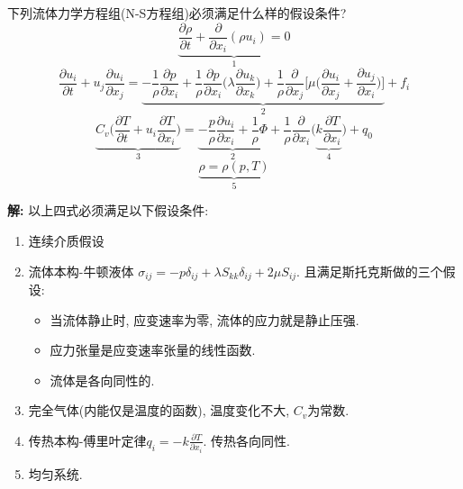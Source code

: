 \begin{problem}[问题3.1]
下列流体力学方程组(N-S方程组)必须满足什么样的假设条件?
\[
\underbrace{\frac{\partial\rho}{\partial t} + \frac{\partial}{\partial x_i}(\rho u_i) = 0}_{1}
\]
\[
\frac{\partial u_i}{\partial t} + u_j\frac{\partial u_i}{\partial x_j}
= \underbrace{- \frac{1}{\rho}\frac{\partial p}{\partial x_i}+\frac{1}{\rho}\frac{\partial p}{\partial x_i} \Big(\lambda\frac{\partial u_k}{\partial x_k}\Big) + \frac{1}{\rho}\frac{\partial}{\partial x_j}\Big[\mu\Big(\frac{\partial u_i}{\partial x_j}+ \frac{\partial u_j}{\partial x_i}\Big)\Big]}_{2} + f_i
\]
\[
\underbrace{C_v\Big(\frac{\partial T}{\partial t} + u_i\frac{\partial T}{\partial x_i}\Big)
}_{3}= \underbrace{-\frac{p}{\rho}\frac{\partial u_i}{\partial x_i}
+ \frac{1}{\rho}\Phi}_{2}
+\frac{1}{\rho}\frac{\partial}{\partial x_i}\Big(\underbrace{k\frac{\partial T}{\partial x_i}}_{4}\Big)
+ q_0
\]
\[
\underbrace{\rho = \rho(p,T)}_{5}
\]
\end{problem}

\begin{solution}
\textbf{解:} 以上四式必须满足以下假设条件:
\begin{enumerate}
\item 连续介质假设
\item 流体本构-牛顿液体 $\sigma_{ij} = -p\delta_{ij}+\lambda S_{kk}\delta_{ij} + 2\mu S_{ij}$.
且满足斯托克斯做的三个假设:
\begin{itemize}
\item 当流体静止时, 应变速率为零, 流体的应力就是静止压强.
\item 应力张量是应变速率张量的线性函数.
\item 流体是各向同性的.
\end{itemize}
\item 完全气体(内能仅是温度的函数), 温度变化不大, $C_v$为常数.
\item 传热本构-傅里叶定律$q_i = -k\frac{\partial T}{\partial x_i}$. 传热各向同性.
\item 均匀系统.
\end{enumerate}

\end{solution} 
